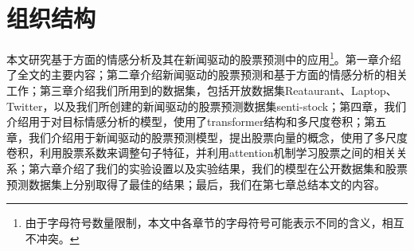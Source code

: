 \section{组织结构}

本文研究基于方面的情感分析及其在新闻驱动的股票预测中的应用\footnote{由于字母符号数量限制，本文中各章节的字母符号可能表示不同的含义，相互不冲突。}。第一章介绍了全文的主要内容；第二章介绍新闻驱动的股票预测和基于方面的情感分析的相关工作；第三章介绍我们所用到的数据集，包括开放数据集Reataurant、Laptop、Twitter，以及我们所创建的新闻驱动的股票预测数据集senti-stock；第四章，我们介绍用于对目标情感分析的模型，使用了transformer结构和多尺度卷积；第五章，我们介绍用于新闻驱动的股票预测模型，提出股票向量的概念，使用了多尺度卷积，利用股票系数来调整句子特征，并利用attention机制学习股票之间的相关关系；第六章介绍了我们的实验设置以及实验结果，我们的模型在公开数据集和股票预测数据集上分别取得了最佳的结果；最后，我们在第七章总结本文的内容。